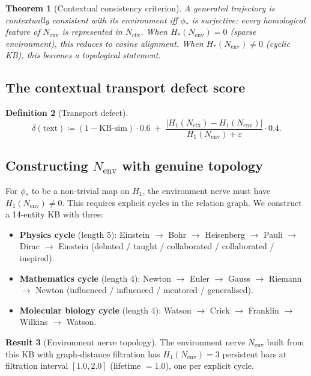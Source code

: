 \documentclass[11pt]{amsart}
\newtheorem{theorem}{Theorem}[section]
\theoremstyle{definition}
\newtheorem{definition}[theorem]{Definition}
\newtheorem{result}[theorem]{Result}
\newcommand{\Nctx}{N_{\mathrm{ctx}}}
\newcommand{\Nenv}{N_{\mathrm{env}}}
\newcommand{\defeq}{\coloneqq}
\begin{document}
\begin{theorem}[Contextual consistency criterion]
\label{thm:consistency}
A generated trajectory is \emph{contextually consistent}
with its environment iff $\phi_*$ is surjective:
every homological feature of $\Nenv$ is represented in $\Nctx$.
When $H_*(\Nenv) = 0$ (sparse environment), this reduces to
cosine alignment. When $H_*(\Nenv) \neq 0$ (cyclic KB), this
becomes a topological statement.
\end{theorem}

\subsection{The contextual transport defect score}

\begin{definition}[Transport defect]
\[
  \delta(\text{text}) \defeq (1 - \mathrm{KB\text{-}sim})\cdot 0.6
  \;+\; \frac{|H_1(\Nctx) - H_1(\Nenv)|}{H_1(\Nenv) + \varepsilon}\cdot 0.4.
\]
\end{definition}

\subsection{Constructing $\Nenv$ with genuine topology}

For $\phi_*$ to be a non-trivial map on $H_1$, the environment nerve
must have $H_1(\Nenv) \neq 0$.
This requires explicit cycles in the relation graph.
We construct a 14-entity KB with three:

\begin{itemize}
\item \textbf{Physics cycle} (length 5):
  Einstein $\to$ Bohr $\to$ Heisenberg $\to$ Pauli $\to$ Dirac $\to$ Einstein
  (debated / taught / collaborated / collaborated / inspired).
\item \textbf{Mathematics cycle} (length 4):
  Newton $\to$ Euler $\to$ Gauss $\to$ Riemann $\to$ Newton
  (influenced / influenced / mentored / generalised).
\item \textbf{Molecular biology cycle} (length 4):
  Watson $\to$ Crick $\to$ Franklin $\to$ Wilkins $\to$ Watson.
\end{itemize}

\begin{result}[Environment nerve topology]
\label{result:Ne-h1}
The environment nerve $\Nenv$ built from this KB
with graph-distance filtration has $H_1(\Nenv) = 3$
persistent bars at filtration interval $[1.0, 2.0]$
(lifetime $= 1.0$), one per explicit cycle.
\end{result}
\end{document}
